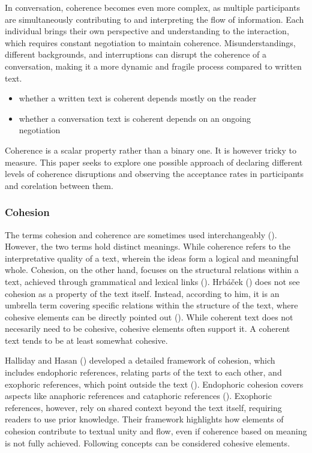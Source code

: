 \documentclass[12pt]{report}
\begin{document}
{\par
    In conversation, coherence becomes even more complex,
    as multiple participants are simultaneously contributing to and interpreting the flow of information.
    Each individual brings their own perspective and understanding to the interaction,
    which requires constant negotiation to maintain coherence.
    Misunderstandings, different backgrounds, and interruptions
    can disrupt the coherence of a conversation,
    making it a more dynamic and fragile process compared to written text.

\begin{itemize}
\item
whether a written text is coherent depends mostly on the reader
\item
whether a conversation text is coherent depends on an ongoing\\ negotiation
\end{itemize}

\par
    Coherence is a scalar property rather than a binary one.
    It is however tricky to measure.
    This paper seeks to explore one possible approach of
    declaring different levels of coherence disruptions
    and observing the acceptance rates in participants
    and corelation between them.

\subsubsection{Cohesion}
\par
The terms cohesion and coherence are sometimes used interchangeably ().
    However, the two terms hold distinct meanings.
    While coherence refers to the interpretative quality of a text,
    wherein the ideas form a logical and meaningful whole.
    Cohesion, on the other hand, focuses on the structural relations
    within a text, achieved through grammatical and lexical links ().
    Hrbáček () does not see cohesion as a property of the text itself.
    Instead, according to him, it is an umbrella term
    covering specific relations within
    the structure of the text,
    where cohesive elements can be directly pointed out ().
    While coherent text does not necesarily need to be cohesive,
    cohesive elements often support it.
    A coherent text tends to be at least somewhat cohesive.

\par
    Halliday and Hasan () developed
    a detailed framework of cohesion, which includes
    endophoric references,
    relating parts of the text to each other, and
    exophoric references, which point outside the text ().
    Endophoric cohesion covers aspects
    like anaphoric references and cataphoric references ().
    Exophoric references, however, rely on shared context beyond the text itself,
    requiring readers to use prior knowledge.
    Their framework highlights how elements of cohesion
    contribute to textual unity and flow, even
    if coherence based on meaning is not fully achieved.
    Following concepts can be considered cohesive elements.

}
\end{document}
